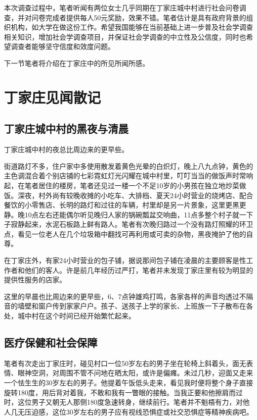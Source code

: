   本次调查过程中，笔者听闻有两位女士几乎同期在丁家庄城中村进行社会问卷调查，并对问卷完成者提供每人50元奖励，效果不错。笔者估计是具有政府背景的组织机构，如大学在做这份工作。希望我国能够在当前基础上进一步普及社会学调查相关知识，增加社会学调查项目，并保证社会学调查的中立性及公信度，同时也希望调查者能够坚守信度和效度问题。

  下一节笔者将介绍在丁家庄中的所见所闻所感。

  \section{丁家庄见闻散记}

  \subsection{丁家庄城中村的黑夜与清晨}

  丁家庄城中村的夜总比周边来的更早些。

  街道路灯不多，住户家中多使用散发着黄色光晕的白炽灯，晚上八九点钟，黄色的主色调混合着个别店铺的七彩霓虹灯光闪耀在城中村里，叮叮当当的做饭声时常响起，在笔者居住的楼房，笔者还见过一楼一个不足10岁的小男孩在独立地炒菜做饭。深夜，村外尚有较晚收摊的小吃车、大排档、夏天24小时营业的烧烤店、配合餐饮的小零售店、长明的路灯和过往的车辆，村里却是另一片景象，这里更黑更静。晚10点左右还能偶尔听见晚归人家的锅碗瓢盆交响曲，11点多整个村子就一下子寂静起来，水泥石板路上鲜有路人。笔者有次晚归路过一个没有路灯照耀的环卫点，看见一位老人在几个垃圾箱中翻找可再利用或可卖的杂物，黑夜掩护了他的自尊。

  在丁家庄外，有家24小时营业的包子铺，据说那间包子铺在凌晨的主要顾客是性工作者和他们的客人。许是前几年经历过严打，笔者并未发现丁家庄里有较为明显的提供性服务的店家。

  这里的早晨也比周边来的更早些，6、7点钟雄鸡打鸣，各家各样的声音均透过不隔音的墙壁和窗户传到家家户户。孩子、送孩子上学的家长、上班族一下子散布在各处，城中村在这个时间已经开始繁忙起来。

  \subsection{医疗保健和社会保障}

  笔者有次走出丁家庄时，碰见村口一位50岁左右的男子坐在轮椅上斜着头，面无表情、眼神空洞，对周围不管不问地在晒太阳，或许是偏瘫。未过几秒，迎面又走来一个怯生生的30岁左右的男子。他提着午饭低头走来，看见我时便将整个身子直接旋转180度，用后背对着我，不敢和我有一瞥眼的接触。当我正要和他擦肩而过时，这位男子又朝无人那侧180度急速转身，继续前行。笔者并不魁梧有力，对他人几无压迫感，这位30岁左右的男子应有视线恐惧症或社交恐惧症等精神疾病吧。

